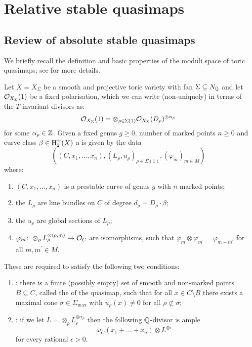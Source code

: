 \section{Relative stable quasimaps} \label{Section relative stable quasimaps}

\subsection{Review of absolute stable quasimaps} \label{Subsection stable quasimaps}
We briefly recall the definition and basic properties of the moduli space of toric quasimaps; see \cite{CF-K} for more details.
\begin{definition}[{\cite[Definition 3.1.1]{CF-K}}] Let $X= X_{\Sigma}$ be a smooth and projective toric variety with fan $\Sigma \subseteq N_{\mathbb{Q}}$ and let $\mathcal{O}_{X_\Sigma}(1)$ be a fixed polarisation, which we can write (non-uniquely) in terms of the $T$-invariant divisors as:
\begin{equation*} \mathcal{O}_{X_\Sigma}(1) = \otimes_{\rho \in \Sigma(1)} \mathcal{O}_{X_\Sigma}(D_\rho)^{\otimes \alpha_\rho} \end{equation*}
for some $\alpha_\rho \in \mathbb{Z}$. Given a fixed genus $g \geq 0$, number of marked points $n \geq 0$ and curve class $\beta \in \operatorname{H}_2^+(X)$ a  is given by the data
\begin{equation*} ((C,x_1,\ldots,x_n), (L_\rho,u_\rho)_{\rho \in \Sigma(1)}, (\varphi_m)_{m \in M}) \end{equation*}
where:
\begin{enumerate}
\item $(C,x_1,\ldots,x_n)$ is a prestable curve of genus $g$ with $n$ marked points;
\item the $L_\rho$ are line bundles on $C$ of degree $d_\rho = D_\rho \cdot \beta$;
\item the $u_\rho$ are global sections of $L_\rho$;
\item $\varphi_m \colon \otimes_\rho L_\rho^{\otimes \langle \rho, m \rangle} \rightarrow \mathcal{O}_C$ are isomorphisms, such that $\varphi_{m} \otimes \varphi_{m^\prime} = \varphi_{m + m^\prime}$ for all $m, m^\prime \in M$.
\end{enumerate}
These are required to satisfy the following two conditions:
\begin{enumerate}
\item {}: there is a finite (possibly empty) set of smooth and non-marked points $B \subseteq C$, called the  of the quasimap, such that for all $x \in C \setminus B$ there exists a maximal cone $\sigma \in \Sigma_{\operatorname{max}}$ with $u_\rho(x) \neq 0$ for all $\rho \not\subset \sigma$;
\item {}: if we let $L = \otimes_\rho L_\rho^{\otimes \alpha_\rho}$ then the following $\mathbb{Q}$-divisor is ample
\begin{equation*} \omega_C(x_1 + \ldots + x_n)\otimes L^{\otimes \epsilon} \end{equation*}
for every rational $\epsilon > 0$.
\end{enumerate}
\end{definition}
